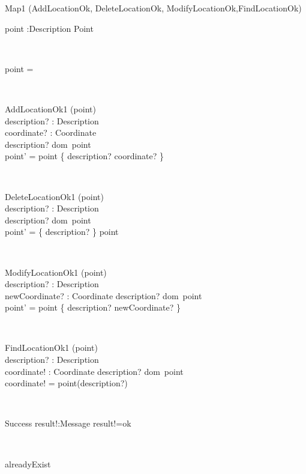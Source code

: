 \documentclass[12pt]{article}
\begin{document}
\begin{spacing}{1.5}
\begin{class}{Map1}
\also
\upharpoonright (AddLocationOk, DeleteLocationOk, ModifyLocationOk,FindLocationOk) \\
\begin{state}
point :Description \pfun Point
\where
\end{state} \\
\begin{init}
point = \emptyset %
\end{init} \\
\begin{op}{AddLocationOk1}
\Delta (point) \\
description? : Description\\
coordinate? : Coordinate\\
\ST
description? \notin dom~point \\
point' = point \cup \{ description? \mapsto coordinate? \} \\
\end{op}\\
\begin{op}{DeleteLocationOk1}
\Delta (point) \\
description? : Description\\
\ST
description? \in dom~point\\
point' = \{ description? \} \ndres point
\end{op}\\
\begin{op}{ModifyLocationOk1}
\Delta (point) \\
description? : Description\\
newCoordinate? : Coordinate
\ST
description? \in dom~point \\
point' = point \oplus \{ description? \mapsto newCoordinate? \}
\end{op}\\
\begin{op}{FindLocationOk1}
\Xi (point) \\
description? : Description\\
coordinate! : Coordinate
\ST
description? \in dom~point \\
coordinate! = point(description?)
\end{op}\\
\begin{op}{Success}
result!:Message
\ST
result!=ok
\end{op}\\
\zbreak
\begin{op}{alreadyExist}

\end{op}
\end{class}
\end{spacing}
\end{document}
